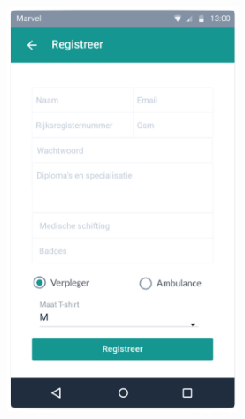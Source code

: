 \begin{figure}[!h]
\begin{subfigure}[h]{0.3\textwidth}
    \includegraphics[width=0.76\textwidth]{images/care-athon/registreer.png}
  \end{subfigure}
  \begin{subfigure}[h]{0.3\textwidth}
    \centering

\end{subfigure}
\end{figure}

